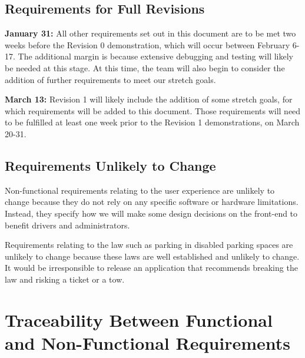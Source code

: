 \documentclass[12pt,letterpaper]{article}
\begin{document}
\subsection{Requirements for Full Revisions}
\textbf{January 31:} All other requirements set out in this document are to be met two weeks before the Revision 0 demonstration, which will occur between February 6-17. The additional margin is because extensive debugging and testing will likely be needed at this stage. At this time, the team will also begin to consider the addition of further requirements to meet our stretch goals.

\textbf{March 13:} Revision 1 will likely include the addition of some stretch goals, for which requirements will be added to this document. Those requirements will need to be fulfilled at least one week prior to the Revision 1 demonstrations, on March 20-31.

\subsection{Requirements Unlikely to Change}
Non-functional requirements relating to the user experience are unlikely to change because they do not rely on any specific software or hardware limitations. Instead, they specify how we will make some design decisions on the front-end to benefit drivers and administrators. 

Requirements relating to the law such as parking in disabled parking spaces are unlikely to change because these laws are well established and unlikely to change. It would be irresponsible to release an application that recommends breaking the law and risking a ticket or a tow.

\newpage
\section{Traceability Between Functional and Non-Functional Requirements}
\label{traceabilityMatrixSection}
\end{document}
